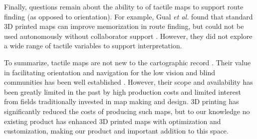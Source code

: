 Finally, questions remain about the ability to of tactile maps to support route finding (as opposed to orientation). For example, Gual \textit{et al.} found that standard 3D printed maps can improve memorization in route finding, but could not be used autonomously without collaborator support \cite{gual2012visual}. However, they did not explore a wide range of tactile variables to support interpretation. 

To summarize, tactile maps are not new to the cartographic record \cite{xx}. Their value in facilitating orientation and navigation for the low vision and blind communities has been well established \cite{XXX}. However, their scope and availability has been greatly limited in the past by high production costs and limited interest from fields traditionally invested in map making and design.  3D printing has significantly reduced the costs of producing such maps, but to our knowledge no existing product has enhanced 3D printed maps with optimization and customization, making our product and important addition to this space. 

